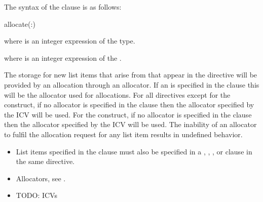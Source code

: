 \syntax

The syntax of the  clause is as follows:

\begin{boxedcode}
allocate(\plc{[allocator}:\plc{] list})
\end{boxedcode}

\ccppspecificstart
\begin{ccppspecific}
where  is an integer expression of the  type.
\end{ccppspecific}
\begin{fortranspecific}
where  is an integer expression of the  .
\end{fortranspecific}

\descr

The storage for new list items that arise from  that appear in the directive will be provided by an allocation through an allocator. If an  is specified in the clause this will be the allocator used for allocations. For all directives except for the  construct, if no allocator is specified in the clause then the allocator specified by the  ICV will be used. For the  construct, if no allocator is specified in the clause then the allocator specified by the  ICV will be used.  The inability of an allocator to fulfil the allocation request for any list item results in undefined behavior.

\restrictions
\begin{itemize}
\item List items specified in the  clause must also be specified in a , , ,  or
       clause in the same directive.
\end{itemize}

\crossreferences
\begin{itemize}
\item Allocators, see .
\item TODO: ICVs
\end{itemize}
